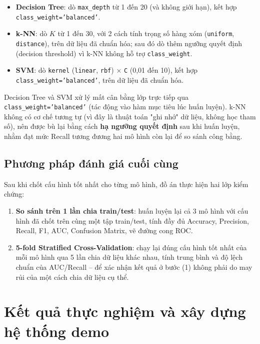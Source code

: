 \documentclass[12pt,a4paper]{report}
\begin{document}
\begin{itemize}
    \item \textbf{Decision Tree}: dò \texttt{max\_depth} từ 1 đến 20 (và không giới hạn), kết hợp \texttt{class\_weight='balanced'}.
    \item \textbf{k-NN}: dò $K$ từ 1 đến 30, với 2 cách tính trọng số hàng xóm (\texttt{uniform}, \texttt{distance}), trên dữ liệu đã chuẩn hóa; sau đó dò thêm ngưỡng quyết định (decision threshold) vì k-NN không hỗ trợ \texttt{class\_weight}.
    \item \textbf{SVM}: dò \texttt{kernel} (\texttt{linear}, \texttt{rbf}) $\times$ \texttt{C} (0,01 đến 10), kết hợp \texttt{class\_weight='balanced'}, trên dữ liệu đã chuẩn hóa.
\end{itemize}

Decision Tree và SVM xử lý mất cân bằng lớp trực tiếp qua \texttt{class\_weight='balanced'} (tác động vào hàm mục tiêu lúc huấn luyện). k-NN không có cơ chế tương tự (vì đây là thuật toán "ghi nhớ" dữ liệu, không học tham số), nên được bù lại bằng cách \textbf{hạ ngưỡng quyết định} sau khi huấn luyện, nhằm đạt mức Recall tương đương hai mô hình còn lại để so sánh công bằng.

\section{Phương pháp đánh giá cuối cùng}

Sau khi chốt cấu hình tốt nhất cho từng mô hình, đồ án thực hiện hai lớp kiểm chứng:
\begin{enumerate}
    \item \textbf{So sánh trên 1 lần chia train/test}: huấn luyện lại cả 3 mô hình với cấu hình đã chốt trên cùng một tập train/test, tính đầy đủ Accuracy, Precision, Recall, F1, AUC, Confusion Matrix, vẽ đường cong ROC.
    \item \textbf{5-fold Stratified Cross-Validation}: chạy lại đúng cấu hình tốt nhất của mỗi mô hình qua 5 lần chia dữ liệu khác nhau, tính trung bình và độ lệch chuẩn của AUC/Recall -- để xác nhận kết quả ở bước (1) không phải do may rủi của một cách chia dữ liệu cụ thể.
\end{enumerate}

\chapter{Kết quả thực nghiệm và xây dựng hệ thống demo}
\end{document}
